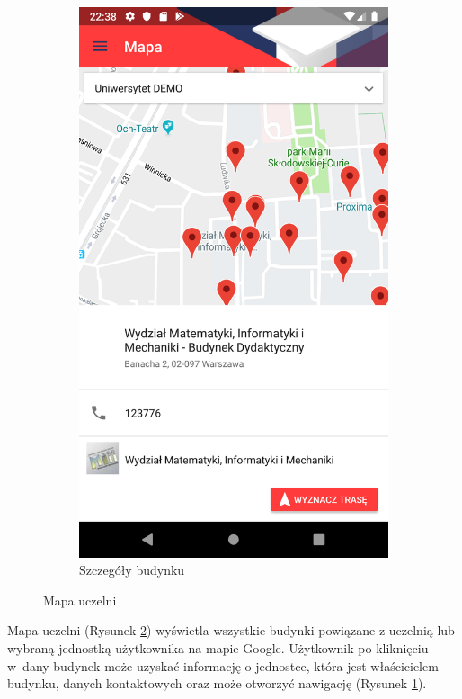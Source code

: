 \documentclass{pracamgr}
\begin{document}
\begin{figure}[p]
\begin{subfigure}[t]{0.3\textwidth}
		\includegraphics[width=\textwidth]{img/map_item.png}
		\caption{Szczegóły budynku}
		\label{fig:map_item}
	\end{subfigure}
	\caption{Mapa uczelni}\label{fig:map}
	\medskip
\end{figure}

Mapa uczelni (Rysunek \ref{fig:map}) wyświetla wszystkie budynki powiązane z uczelnią lub wybraną jednostką
użytkownika na mapie Google. Użytkownik po kliknięciu w~dany budynek może uzyskać
informację o jednostce, która jest właścicielem budynku, danych kontaktowych oraz
może otworzyć nawigację (Rysunek \ref{fig:map_item}).
\end{document}
